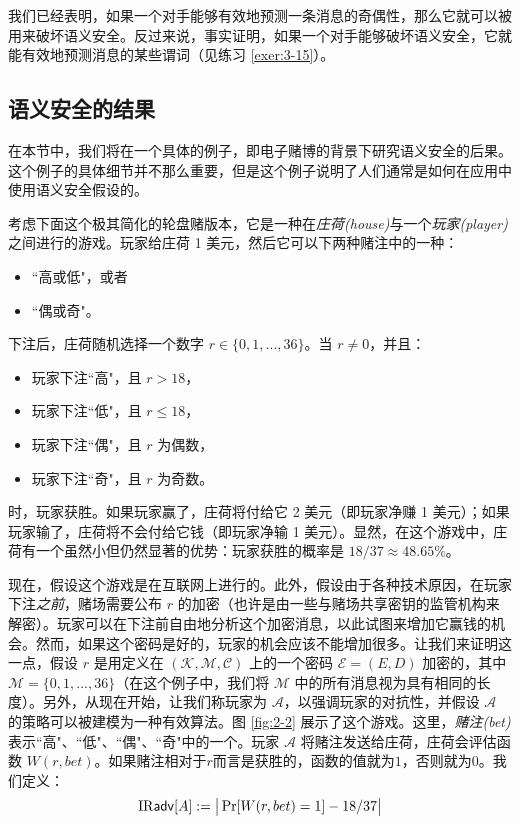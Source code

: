 我们已经表明，如果一个对手能够有效地预测一条消息的奇偶性，那么它就可以被用来破坏语义安全。反过来说，事实证明，如果一个对手能够破坏语义安全，它就能有效地预测消息的某些谓词（见练习 \ref{exer:3-15}）。

\subsection{语义安全的结果}\label{subsec:2-2-4}

在本节中，我们将在一个具体的例子，即电子赌博的背景下研究语义安全的后果。这个例子的具体细节并不那么重要，但是这个例子说明了人们通常是如何在应用中使用语义安全假设的。

考虑下面这个极其简化的轮盘赌版本，它是一种在\emph{庄荷(house)}与一个\emph{玩家(player)}之间进行的游戏。玩家给庄荷 1 美元，然后它可以下两种赌注中的一种：
\begin{itemize}
	\item ``高或低"，或者
	\item ``偶或奇"。
\end{itemize}
下注后，庄荷随机选择一个数字 $r\in\{0,1,...,36\}$。当 $r\neq 0$，并且：
\begin{itemize}
	\item 玩家下注``高"，且 $r>18$，
	\item 玩家下注``低"，且 $r\leq18$，
	\item 玩家下注``偶"，且 $r$ 为偶数，
	\item 玩家下注``奇"，且 $r$ 为奇数。
\end{itemize}
时，玩家获胜。如果玩家赢了，庄荷将付给它 2 美元（即玩家净赚 1 美元）；如果玩家输了，庄荷将不会付给它钱（即玩家净输 1 美元）。显然，在这个游戏中，庄荷有一个虽然小但仍然显著的优势：玩家获胜的概率是 $18/37\approx48.65\%$。

现在，假设这个游戏是在互联网上进行的。此外，假设由于各种技术原因，在玩家下注\emph{之前}，赌场需要公布 $r$ 的加密（也许是由一些与赌场共享密钥的监管机构来解密）。玩家可以在下注前自由地分析这个加密消息，以此试图来增加它赢钱的机会。然而，如果这个密码是好的，玩家的机会应该不能增加很多。让我们来证明这一点，假设 $r$ 是用定义在 $(\mathcal{K},\mathcal{M},\mathcal{C})$ 上的一个密码 $\mathcal{E}=(E,D)$ 加密的，其中 $\mathcal{M}=\{0,1,...,36\}$（在这个例子中，我们将 $\mathcal{M}$ 中的所有消息视为具有相同的长度）。另外，从现在开始，让我们称玩家为 $\mathcal{A}$，以强调玩家的对抗性，并假设 $\mathcal{A}$ 的策略可以被建模为一种有效算法。图 \ref{fig:2-2} 展示了这个游戏。这里，\emph{赌注(bet)}表示``高"、``低"、``偶"、``奇"中的一个。玩家 $\mathcal{A}$ 将赌注发送给庄荷，庄荷会评估函数 $W(r,bet)$。如果赌注相对于$r$而言是获胜的，函数的值就为$1$，否则就为$0$。我们定义：
\[
{\rm IR\mathsf{adv}}[A]:=\big\lvert\Pr[W (r,bet)=1]-{18}/{37}\big\rvert
\]

